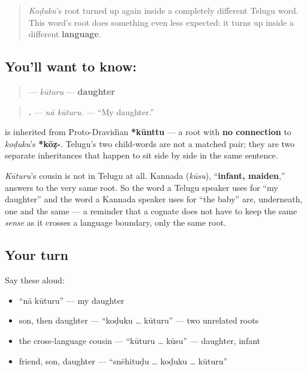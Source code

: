 \label{lesson:TE-C36-kuuturu}



\begin{quote}
\emph{Koḍuku}'s root turned up again inside a completely different Telugu word. This word's root does something even less expected: it turns up inside a different \textbf{language}.
\end{quote}

\subsection*{You'll want to know: }
\begin{quote}
\textbf{} — \emph{kūturu} — \textbf{daughter}
\end{quote}

\begin{quote}
\textbf{ .} — \emph{nā kūturu.} — \textquotedblleft{}My daughter.\textquotedblright{}
\end{quote}

\begin{cousinweb}
\textbf{} is inherited from Proto-Dravidian \textbf{*kūnttu} — a root with \textbf{no connection} to \emph{koḍuku}'s \textbf{*kōẓ-}. Telugu's two child-words are not a matched pair; they are two separate inheritances that happen to sit side by side in the same sentence.

\emph{Kūturu}'s cousin is not in Telugu at all. Kannada \textbf{} (\emph{kūsu}), \textquotedblleft{}\textbf{infant, maiden},\textquotedblright{} answers to the very same root. So the word a Telugu speaker uses for \textquotedblleft{}my daughter\textquotedblright{} and the word a Kannada speaker uses for \textquotedblleft{}the baby\textquotedblright{} are, underneath, one and the same — a reminder that a cognate does not have to keep the same \emph{sense} as it crosses a language boundary, only the same root.
\end{cousinweb}

\subsection*{Your turn}
Say these aloud:

\begin{itemize}
\raggedright
  \item \textquotedblleft{}nā kūturu\textquotedblright{} — my daughter
  \item son, then daughter — \textquotedblleft{}koḍuku … kūturu\textquotedblright{} — two unrelated roots
  \item the cross-language cousin — \textquotedblleft{}kūturu … kūsu\textquotedblright{} — daughter, infant
  \item friend, son, daughter — \textquotedblleft{}snēhituḍu … koḍuku … kūturu\textquotedblright{}
\end{itemize}

